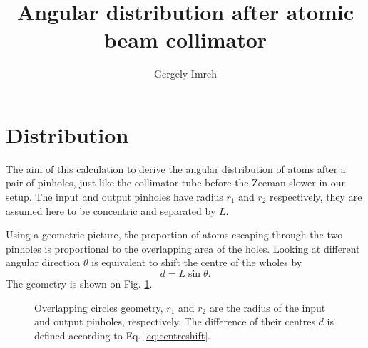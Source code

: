 \documentclass[10pt,a4paper]{article}
\author{Gergely Imreh}
\title{Angular distribution after atomic beam collimator}
\begin{document}
\maketitle

\section{Distribution}
The aim of this calculation to derive the angular distribution of atoms after a pair of pinholes, just like the collimator tube before the Zeeman slower in our setup. The input and output pinholes have radius $r_1$ and $r_2$ respectively, they are assumed here to be concentric and separated by $L$.

Using a geometric picture, the proportion of atoms escaping through the two pinholes is proportional to the overlapping area of the holes. Looking at different angular direction $\theta$ is equivalent to shift the centre of the wholes by
\begin{equation}
d = L \sin\theta.
\label{eq:centreshift}
\end{equation}
The geometry is shown on Fig. \ref{fig:overlapping}.

\begin{figure}[ht]
\centering
{}
\caption{Overlapping circles geometry, $r_1$ and $r_2$ are the radius of the input and output pinholes, respectively. The difference of their centres $d$ is defined according to Eq. \ref{eq:centreshift}.}
\label{fig:overlapping}
\end{figure}
\end{document}
